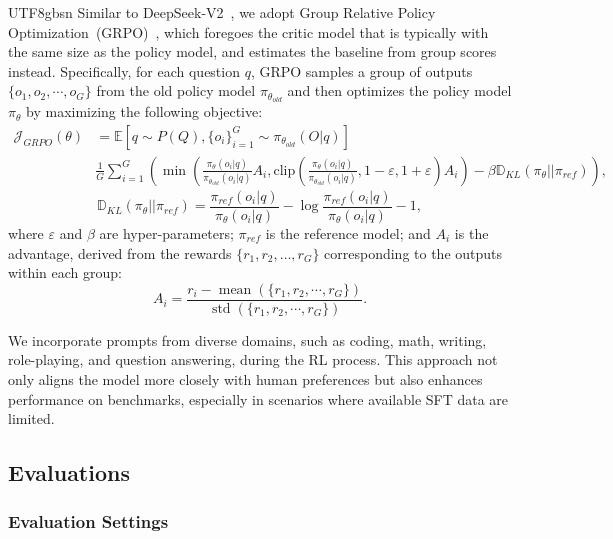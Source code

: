 \documentclass[11pt, a4paper, logo, copyright, nonumbering]{deepseek}
\newcommand{\dsvii}{DeepSeek-V2}
\renewcommand{\epsilon}{\varepsilon}
\begin{document}
\begin{CJK*}{UTF8}{gbsn}
Similar to \dsvii{}~\citep{dsvii}, we adopt Group Relative Policy Optimization~(GRPO)~\citep{deepseekmath}, which foregoes the critic model that is typically with the same size as the policy model, and estimates the baseline from group scores instead. 
Specifically, for each question $q$, GRPO samples a group of outputs $\{o_1, o_2, \cdots, o_G\}$ from the old policy model $\pi_{\theta_{old}}$ and then optimizes the policy model $\pi_{\theta}$ by maximizing the following objective:
\begin{equation}
\begin{split}
    \mathcal{J}_{GRPO}(\theta) &= \mathbb{E}{[q \sim P(Q), \{o_i\}_{i=1}^G \sim \pi_{\theta_{old}}(O|q)]}  \\
    & \frac{1}{G}\sum_{i=1}^G \left( \min \left( \frac{\pi_\theta(o_i |q)}{\pi_{\theta_{old}}(o_i |q)} A_i, \text{clip} \left( \frac{\pi_\theta(o_i |q)}{\pi_{\theta_{old}}(o_i |q)}, 1 - \epsilon, 1 + \epsilon \right)  A_i \right) - \beta \mathbb{D}_{KL}\left(\pi_{\theta} || \pi_{ref}\right)\right) ,
\end{split}
\label{eq:GRPO-obj}
\end{equation}
\begin{equation}
    \mathbb{D}_{KL}\left(\pi_{\theta} || \pi_{ref}\right) = \frac{\pi_{ref}(o_i|q)}{\pi_{\theta}(o_i|q)}- \log\frac{\pi_{ref}(o_i|q)}{\pi_{\theta}(o_i|q)} - 1,
\end{equation}
where $\epsilon$ and $\beta$ are hyper-parameters; 
$\pi_{ref}$ is the reference model; 
and $A_i$ is the advantage, derived from the rewards $\{r_1, r_2, \ldots, r_G\}$ corresponding to the outputs within each group:
\begin{equation}
    A_i = \frac{r_i - {\operatorname{mean}(\{r_1, r_2, \cdots, r_G\})}}{{\operatorname{std}(\{r_1, r_2, \cdots, r_G\})}}.
\end{equation}

We incorporate prompts from diverse domains, such as coding, math, writing, role-playing, and question answering, during the RL process. 
This approach not only aligns the model more closely with human preferences but also enhances performance on benchmarks, especially in scenarios where available SFT data are limited.

\subsection{Evaluations}

\subsubsection{Evaluation Settings}


\end{CJK*}
\end{document}
